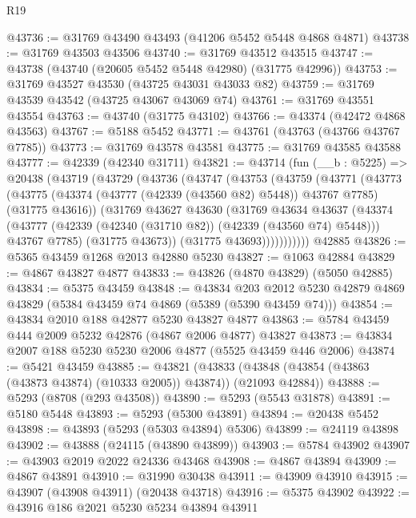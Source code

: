 \begin{lexlean}{R19}
\begin{coremodule}
@43736 := @31769 @43490 @43493 (@41206 @5452 @5448 @4868 @4871)
@43738 := @31769 @43503 @43506
@43740 := @31769 @43512 @43515
@43747 := @43738 (@43740 (@20605 @5452 @5448 @42980) (@31775 @42996))
@43753 := @31769 @43527 @43530 (@43725 @43031 @43033 @82)
@43759 := @31769 @43539 @43542 (@43725 @43067 @43069 @74)
@43761 := @31769 @43551 @43554
@43763 := @43740 (@31775 @43102)
@43766 := @43374 (@42472 @4868 @43563)
@43767 := @5188 @5452
@43771 := @43761 (@43763 (@43766 @43767 @7785))
@43773 := @31769 @43578 @43581
@43775 := @31769 @43585 @43588
@43777 := @42339 (@42340 @31711)
@43821 := @43714
    (fun (__b : @5225) =>
    @20438
      (@43719
        (@43729
          (@43736
            (@43747
              (@43753
                (@43759
                  (@43771
                    (@43773
                      (@43775
                        (@43374 (@43777 (@42339 (@43560 @82) @5448)) @43767 @7785)
                        (@31775 @43616))
                      (@31769
                        @43627
                        @43630
                        (@31769
                          @43634
                          @43637
                          (@43374
                            (@43777 (@42339 (@42340 (@31710 @82)) (@42339 (@43560 @74) @5448)))
                            @43767
                            @7785)
                          (@31775 @43673))
                        (@31775 @43693)))))))))))
    @42885
@43826 := @5365 @43459 @1268 @2013 @42880 @5230
@43827 := @1063 @42884
@43829 := @4867 @43827 @4877
@43833 := @43826 (@4870 @43829) (@5050 @42885)
@43834 := @5375 @43459
@43848 := @43834
    @203
    @2012
    @5230
    @42879
    @4869
    @43829
    (@5384 @43459 @74 @4869 (@5389 (@5390 @43459 @74)))
@43854 := @43834 @2010 @188 @42877 @5230 @43827 @4877
@43863 := @5784 @43459 @444 @2009 @5232 @42876 (@4867 @2006 @4877) @43827
@43873 := @43834 @2007 @188 @5230 @5230 @2006 @4877 (@5525 @43459 @446 @2006)
@43874 := @5421 @43459
@43885 := @43821
    (@43833 (@43848 (@43854 (@43863 (@43873 @43874) (@10333 @2005)) @43874)) (@21093 @42884))
@43888 := @5293 (@8708 (@293 @43508))
@43890 := @5293 (@5543 @31878)
@43891 := @5180 @5448
@43893 := @5293 (@5300 @43891)
@43894 := @20438 @5452
@43898 := @43893 (@5293 (@5303 @43894) @5306)
@43899 := @24119 @43898
@43902 := @43888 (@24115 (@43890 @43899))
@43903 := @5784 @43902
@43907 := @43903 @2019 @2022 @24336 @43468
@43908 := @4867 @43894
@43909 := @4867 @43891
@43910 := @31990 @30438
@43911 := @43909 @43910
@43915 := @43907 (@43908 @43911) (@20438 @43718)
@43916 := @5375 @43902
@43922 := @43916 @186 @2021 @5230 @5234 @43894 @43911

\end{coremodule}
\end{lexlean}
